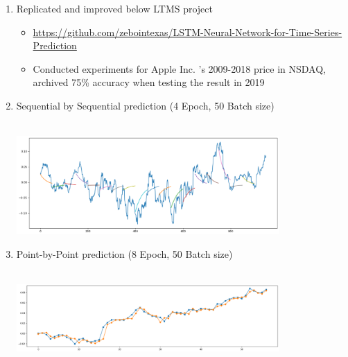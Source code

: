 \begin{enumerate}

    \item{Replicated and improved below LTMS project
    \begin{itemize}
    
  
    \item \url{https://github.com/zebointexas/LSTM-Neural-Network-for-Time-Series-Prediction}
    
    \item Conducted experiments for Apple Inc. 's 2009-2018 price in NSDAQ, archived 75\% accuracy when testing the result in 2019 
    
    \end{itemize}
    }
    \item {Sequential by Sequential prediction (4 Epoch, 50 Batch size)
    
      \\
     
            \includegraphics[width=10cm]{Chapters/Chapter_5_Section/SS_4_50.png}
            
         
 
    }
    
  \item { Point-by-Point prediction (8 Epoch, 50 Batch size)
    
      \\
     
          
            
            \includegraphics[width=10cm]{Chapters/Chapter_5_Section/PP_8_50.png}
 
    }
    
\end{enumerate}    